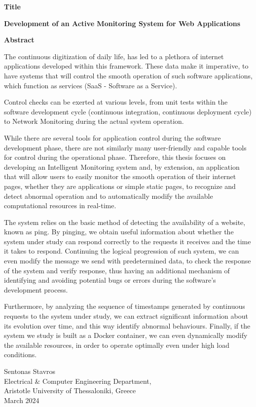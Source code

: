{\selectfont

{}


\begin{center}
  \centering
  \textbf{\Large{Title}}
  \vspace{0.5cm}

  \textbf{\large{Development of an Active Monitoring System for Web Applications}}
  \vspace{1cm}

  \centering
  \textbf{Abstract}
\end{center}

The continuous digitization of daily life, has led to a plethora of internet applications developed within this framework. These data make it imperative, to have systems that will control the smooth operation of such software applications, which function as services (SaaS - Software as a Service).

Control checks can be exerted at various levels, from unit tests within the software development cycle (continuous integration, continuous deployment cycle) to Network Monitoring during the actual system operation.

While there are several tools for application control during the software development phase, there are not similarly many user-friendly and capable tools for control during the operational phase. Therefore, this thesis focuses on developing an Intelligent Monitoring system and, by extension, an application that will allow users to easily monitor the smooth operation of their internet pages, whether they are applications or simple static pages, to recognize and detect abnormal operation and to automatically modify the available computational resources in real-time.

The system relies on the basic method of detecting the availability of a website, known as ping. By pinging, we obtain useful information about whether the system under study can respond correctly to the requests it receives and the time it takes to respond. Continuing the logical progression of such system, we can even modify the message we send with predetermined data, to check the response of the system and verify response, thus having an additional mechanism of identifying and avoiding potential bugs or errors during the software’s development process.

Furthermore, by analyzing the sequence of timestamps generated by continuous requests to the system under study, we can extract significant information about its evolution over time, and this way identify abnormal behaviours. Finally, if the system we study is built as a Docker container, we can even dynamically modify the available resources, in order to operate optimally even under high load conditions.


\begin{flushright}
  \vspace{2cm}
  Sentonas Stavros
  \\
  Electrical \& Computer Engineering Department,
  \\
  Aristotle University of Thessaloniki, Greece
  \\
  March 2024
\end{flushright}

}
